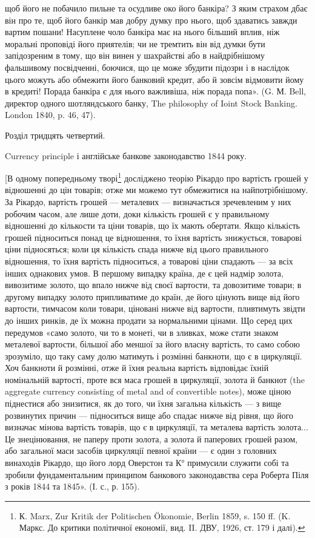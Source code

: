щоб його не побачило пильне та осудливе око його банкіра? З яким страхом
дбає він про те, щоб його банкір мав добру думку про нього, щоб здаватись
завжди вартим пошани! Насуплене чоло банкіра має на нього більший вплив,
ніж моральні проповіді його приятелів; чи не тремтить він від думки бути запідозреним
в тому, що він винен у шахрайстві або в найдрібнішому фальшивому
посвідченні, боючися, що це може збудити підозри і в наслідок цього можуть
або обмежити його банковий кредит, або й зовсім відмовити йому в кредиті!
Порада банкіра є для нього важливіша, ніж порада попа». (G. М. Bell, директор
одного шотляндського банку, The philosophy of Ioint Stock Banking. London 1840,
p. 46, 47).

Розділ тридцять четвертий.

Currency principle і англійське банкове законодавство
1844 року.

[В одному попередньому творі\footnote{
К. Marx, Zur Kritik der Politischen Ökonomie, Berlin 1859, s. 150 ff. (K. Маркс. До критики
політичної економії, вид. II. ДВУ, 1926, ст. 179 і далі).
} досліджено теорію Рікардо про вартість
грошей у відношенні до цін товарів; отже ми можемо тут обмежитися на найпотрібнішому.
За Рікардо, вартість грошей — металевих — визначається зречевленим
у них робочим часом, але лише доти, доки кількість грошей є у правильному
відношенні до кількости та ціни товарів, що їх мають обертати. Якщо
кількість грошей підноситься понад це відношення, то їхня вартість знижується,
товарові ціни підносяться; коли ця кількість спада нижче від цього правильного
відношення, то їхня вартість підноситься, а товарові ціни спадають — за всіх інших
однакових умов. В першому випадку країна, де є цей надмір золота,
вивозитиме золото, що впало нижче від своєї вартости, та довозитиме товари;
в другому випадку золото припливатиме до країн, де його цінують вище від його
вартости, тимчасом коли товари, ціновані нижче від вартости, пливтимуть звідти
до інших ринків, де їх можна продати за нормальними цінами. Що серед цих
передумов «само золото, чи то в монеті, чи в зливках, може стати знаком металевої
вартости, більшої або меншої за його власну вартість, то само собою
зрозуміло, що таку саму долю матимуть і розмінні банкноти, що є в циркуляції.
Хоч банкноти й розмінні, отже й їхня реальна вартість відповідає їхній номінальній
вартості, проте вся маса грошей в циркуляції, золота й банкнот (the
aggregate currency consisting of metal and of convertible notes), може ціною піднестися
або знизитися, як до того, чи їхня загальна кількість — з вище розвинутих
причин — підноситься вище або спадає нижче від рівня, що його визначає
мінова вартість товарів, що є в циркуляції, та металева вартість золота... Це
знецінювання, не паперу проти золота, а золота й паперових грошей разом, або
загальної маси засобів циркуляції певної країни — є один з головних винаходів
Рікардо, що його лорд Оверстон та К° примусили служити собі та зробили фундаментальним
принципом банкового законодавства сера Роберта Піля з років
1844 та 1845». (І. с., р. 155).

